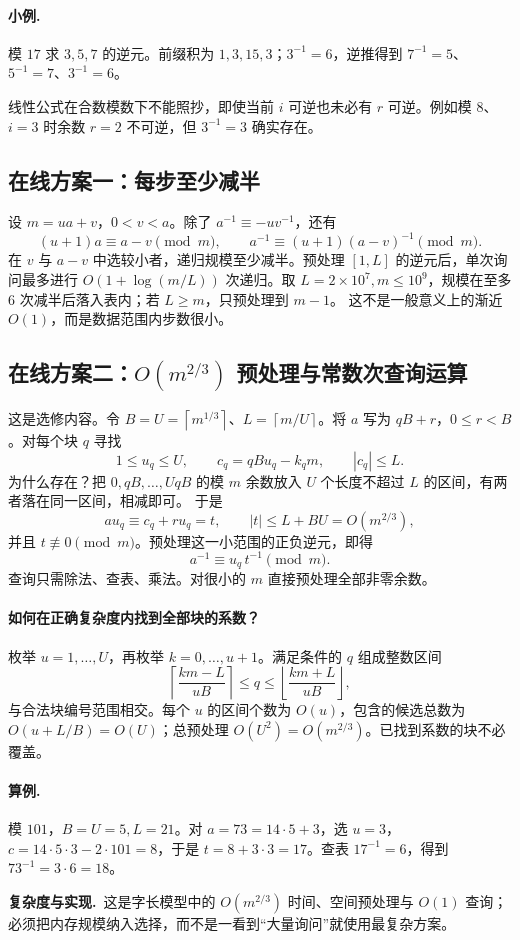 \documentclass[UTF8,a4paper,11pt,oneside,openany,fontset=fandol]{ctexbook}
\theoremstyle{definition}
\newcommand{\floor}[1]{\left\lfloor #1\right\rfloor}
\newcommand{\ceil}[1]{\left\lceil #1\right\rceil}
\newcommand{\cost}{\par\noindent\textbf{复杂度与实现.}\ }
\begin{document}
\paragraph{小例.} 模 $17$ 求 $3,5,7$ 的逆元。前缀积为 $1,3,15,3$；$3^{-1}=6$，逆推得到 $7^{-1}=5$、$5^{-1}=7$、$3^{-1}=6$。

\begin{pitfall}
线性公式在合数模数下不能照抄，即使当前 $i$ 可逆也未必有 $r$ 可逆。例如模 $8$、$i=3$ 时余数 $r=2$ 不可逆，但 $3^{-1}=3$ 确实存在。
\end{pitfall}

\subsection{在线方案一：每步至少减半}
设 $m=ua+v$，$0<v<a$。除了 $a^{-1}\equiv-u v^{-1}$，还有
\[
 (u+1)a\equiv a-v\pmod m,
 \qquad a^{-1}\equiv(u+1)(a-v)^{-1}\pmod m.
\]
在 $v$ 与 $a-v$ 中选较小者，递归规模至少减半。预处理 $[1,L]$ 的逆元后，单次询问最多进行 $O(1+\log(m/L))$ 次递归。取 $L=2\times10^7,m\le10^9$，规模在至多 $6$ 次减半后落入表内；若 $L\ge m$，只预处理到 $m-1$。
这不是一般意义上的渐近 $O(1)$，而是数据范围内步数很小。

\subsection{在线方案二：\texorpdfstring{$O(m^{2/3})$}{O(m2/3)} 预处理与常数次查询运算}
这是选修内容。令 $B=U=\ceil{m^{1/3}}$、$L=\ceil{m/U}$。将 $a$ 写为 $qB+r$，$0\le r<B$。对每个块 $q$ 寻找
\[
1\le u_q\le U,\qquad c_q=qBu_q-k_qm,\qquad |c_q|\le L.
\]
为什么存在？把 $0,qB,\ldots,UqB$ 的模 $m$ 余数放入 $U$ 个长度不超过 $L$ 的区间，有两者落在同一区间，相减即可。
于是
\[
 a u_q\equiv c_q+ru_q=t,\qquad |t|\le L+BU=O(m^{2/3}),
\]
并且 $t\not\equiv0\pmod m$。预处理这一小范围的正负逆元，即得
\[
 a^{-1}\equiv u_q\,t^{-1}\pmod m.
\]
查询只需除法、查表、乘法。对很小的 $m$ 直接预处理全部非零余数。

\paragraph{如何在正确复杂度内找到全部块的系数？}
枚举 $u=1,\ldots,U$，再枚举 $k=0,\ldots,u+1$。满足条件的 $q$ 组成整数区间
\[
 \ceil{\frac{km-L}{uB}}\le q\le\floor{\frac{km+L}{uB}},
\]
与合法块编号范围相交。每个 $u$ 的区间个数为 $O(u)$，包含的候选总数为 $O(u+L/B)=O(U)$；总预处理 $O(U^2)=O(m^{2/3})$。已找到系数的块不必覆盖。

\paragraph{算例.} 模 $101$，$B=U=5,L=21$。对 $a=73=14\cdot5+3$，选 $u=3$，$c=14\cdot5\cdot3-2\cdot101=8$，于是 $t=8+3\cdot3=17$。查表 $17^{-1}=6$，得到 $73^{-1}=3\cdot6=18$。
\cost 这是字长模型中的 $O(m^{2/3})$ 时间、空间预处理与 $O(1)$ 查询；必须把内存规模纳入选择，而不是一看到“大量询问”就使用最复杂方案。
\end{document}
